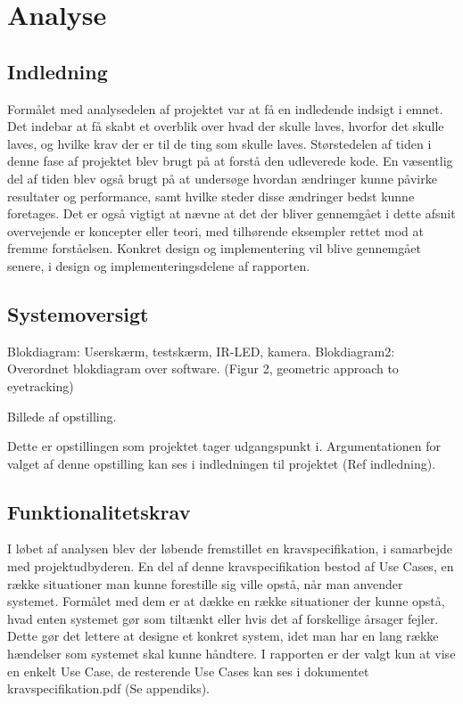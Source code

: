 \documentclass[rapport.tex]{subfiles}
\begin{document}
\section{Analyse}
	\subsection{Indledning}
	Formålet med analysedelen af projektet var at få en indledende indsigt i emnet. Det indebar at få skabt et overblik over hvad der skulle laves, hvorfor det skulle laves, og hvilke krav der er til de ting som skulle laves. Størstedelen af tiden i denne fase af projektet blev brugt på at forstå den udleverede kode. En væsentlig del af tiden blev også brugt på at undersøge hvordan ændringer kunne påvirke resultater og performance, samt hvilke steder disse ændringer bedst kunne foretages. Det er også vigtigt at nævne at det der bliver gennemgået i dette afsnit overvejende er koncepter eller teori, med tilhørende eksempler rettet mod at fremme forståelsen. Konkret design og implementering vil blive gennemgået senere, i design og implementeringsdelene af rapporten.
	
	\subsection{Systemoversigt}
	
	Blokdiagram: Userskærm, testskærm, IR-LED, kamera.
	Blokdiagram2: Overordnet blokdiagram over software. (Figur 2, geometric approach to eyetracking)
	
	Billede af opstilling.
	
	
	
	
	Dette er opstillingen som projektet tager udgangspunkt i. Argumentationen for valget af denne opstilling kan ses i indledningen til projektet (Ref indledning).
	
	\subsection{Funktionalitetskrav}
	
		I løbet af analysen blev der løbende fremstillet en kravspecifikation, i samarbejde med projektudbyderen. En del af denne kravspecifikation bestod af Use Cases, en række situationer man kunne forestille sig ville opstå, når man anvender systemet. Formålet med dem er at dække en række situationer der kunne opstå, hvad enten systemet gør som tiltænkt eller hvis det af forskellige årsager fejler. Dette gør det lettere at designe et konkret system, idet man har en lang række hændelser som systemet skal kunne håndtere. I rapporten er der valgt kun at vise en enkelt Use Case, de resterende Use Cases kan ses i dokumentet kravspecifikation.pdf (Se appendiks). 
	
\end{document}
